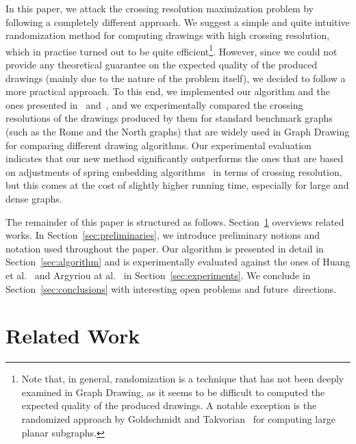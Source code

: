 \documentclass{llncs}
\begin{document}
In this paper, we attack the crossing resolution maximization problem by following a completely different approach. We suggest a simple and quite intuitive randomization method for computing drawings with high crossing resolution, which in practise turned out to be quite efficient\footnote{Note that, in general, randomization is a technique that has not been deeply examined in Graph Drawing, as it seems to be difficult to computed the expected quality of the produced drawings. A notable exception is the randomized approach by Goldschmidt and Takvorian~\cite{DBLP:journals/networks/GoldschmidtT94} for computing large planar subgraphs.}. However, since we could not provide any theoretical guarantee on the expected quality of the produced drawings (mainly due to the nature of the problem itself), we decided to follow a more practical approach. To this end, we implemented our algorithm and the ones presented in~\cite{DBLP:journals/vlc/HuangEHL13} and~\cite{DBLP:journals/cj/ArgyriouBS13}, and we experimentally compared the crossing resolutions of the drawings produced by them for standard benchmark graphs (such as the Rome and the North graphs) that are widely used in Graph Drawing for comparing different drawing algorithms. Our experimental evaluation indicates that our new method significantly outperforms the ones that are based on adjustments of spring embedding algorithms~\cite{DBLP:journals/vlc/HuangEHL13,DBLP:journals/cj/ArgyriouBS13} in terms of crossing resolution, but this comes at the cost of slightly higher running time, especially for large and dense graphs. 

The remainder of this paper is structured as follows. Section~\ref{sec:relatedwork} overviews related works. In Section~\ref{sec:preliminaries}, we introduce preliminary notions and notation used throughout the paper. Our algorithm is presented in detail in Section~\ref{sec:algorithm} and is experimentally evaluated against the ones of Huang et al.~\cite{DBLP:journals/vlc/HuangEHL13} and Argyriou at al.~\cite{DBLP:journals/cj/ArgyriouBS13} in Section~\ref{sec:experiments}. We conclude in Section~\ref{sec:conclusions} with interesting open problems and future~directions.
 
\section{Related Work}
\label{sec:relatedwork}
\end{document}
